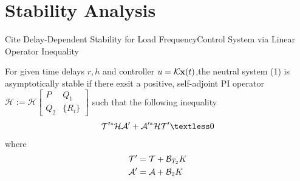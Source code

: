 \documentclass[twocolumn]{autart}    %
\begin{document}
\section{Stability Analysis}
Cite Delay-Dependent Stability for Load FrequencyControl System via Linear Operator Inequality 

\begin{thm}
For given time delays $r,h$ and controller $u = \mathcal{K}\bold{x}(t)$,the neutral system (1) is asymptotically stable if there exsit a positive, self-adjoint PI operator $\mathcal{H}:=\mathcal{H}\begin{bmatrix}
    P & Q_{1}\\
    Q_{2} & \{R_{i}\}
\end{bmatrix}$ such that the following inequality
    \begin{equation}
        \begin{aligned}
            \setlength{\arraycolsep}{0.9pt}
            \mathcal{T}'^{*}\mathcal{H}\mathcal{A}'+\mathcal{A}'^{*}\mathcal{H}\mathcal{T}' \textless 0
        \end{aligned}
    \end{equation}
where
\begin{equation}
    \begin{aligned}
        \setlength{\arraycolsep}{0.9pt}
        &\mathcal{T}' = \mathcal{T}+\mathcal{B}_{T_{2}}K\\
        &\mathcal{A}' = \mathcal{A}+\mathcal{B}_{2}K
    \end{aligned}
    \nonumber 
\end{equation}
\end{thm}
\end{document}
